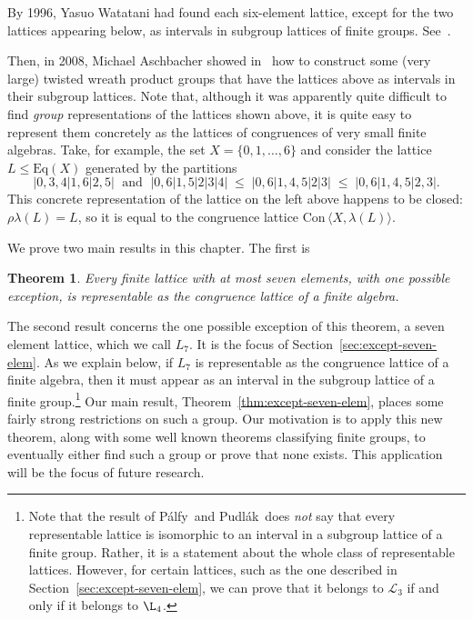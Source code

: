 \documentclass[cm,dissertation,actual,final]{uhthesis}
\theoremstyle{plain}
\newtheorem{theorem}{Theorem}[section]
\theoremstyle{definition}
\theoremstyle{remark}
\numberwithin{theorem}{section}
\numberwithin{claim}{chapter}
\numberwithin{equation}{section}
\numberwithin{conjecture}{chapter}
\newcommand{\Palfy}{P\'alfy}
\newcommand{\Pudlak}{Pudl\'ak}
\newcommand{\<}{\ensuremath{\langle}}
\renewcommand{\>}{\ensuremath{\rangle}}
\renewcommand{\leq}{\ensuremath{\leqslant}}
\newcommand{\Eq}{\ensuremath{\mathrm{Eq}}}
\newcommand{\Con}{\ensuremath{\mathrm{Con\,}}}
\newcommand{\0}{\ensuremath{\mathbf{0}}}
\newcommand{\1}{\ensuremath{\mathbf{1}}}
\newcommand{\2}{\ensuremath{\mathbf{2}}}
\newcommand{\3}{\ensuremath{\mathbf{3}}}
\newcommand{\4}{\ensuremath{\mathbf{4}}}
\newcommand{\5}{\ensuremath{\mathbf{5}}}
\newcommand{\sL}{\ensuremath{\mathscr{L}}}
\begin{document}
%
By 1996, Yasuo Watatani had found each six-element lattice, except for the
two lattices appearing below, as intervals in subgroup lattices of finite
groups.  
See~\cite{Watatani:1996}.
\begin{multicols}{2}
\hskip4cm
  \begin{tikzpicture}[scale=.5]
    
  \end{tikzpicture}
  \par \vfill \columnbreak
  \begin{tikzpicture}[scale=.6]
    
  \end{tikzpicture}
\end{multicols}
%
Then, in 2008, Michael Aschbacher
showed in~\cite{Aschbacher:2008} how to construct some (very large) twisted wreath product 
groups that have the lattices above as intervals in their subgroup lattices.
Note that, although it was apparently quite difficult to find \emph{group}
representations of the lattices shown above, it is quite easy to
represent them concretely as the lattices of congruences of very small finite
algebras.  Take, for example, the set $X=\{0,1,\dots, 6\}$ and consider the
lattice $L\leq \Eq(X)$ generated by the partitions
  \[
|0,3,4|1,6|2,5| \; \text{ and } \;  |0,6|1,5|2|3|4|  \; \leq \; |0,6|1,4,5|2|3|\; \leq \;|0,6|1,4,5|2,3|.
  \]
This concrete representation of the lattice on the left above happens to be closed:
$\rho \lambda(L) = L$, so it is equal to the congruence lattice $\Con\<X, \lambda(L)\>$.  

We prove two main results in this chapter.  The first is
\begin{theorem}
\label{thm:sevenelementlattices}
  Every finite lattice with at most seven elements, with one possible exception,
  is representable as the congruence lattice of a finite algebra.
\end{theorem}
The second result concerns the one possible exception of this theorem, 
a seven element lattice, which we call $L_7$.  It is the focus of
Section~\ref{sec:except-seven-elem}.
As we explain below, 
if $L_7$ is representable as the congruence lattice of a finite
algebra, then it must appear as an interval in the subgroup lattice of a finite
group.\footnote{Note that the result of \Palfy\ and \Pudlak\ does \emph{not} say
  that every representable lattice is isomorphic to an interval in a subgroup
  lattice of a finite group.  Rather, it is a statement about the whole class of
  representable lattices.  However, for certain lattices, such as the one described
in Section~\ref{sec:except-seven-elem}, we can prove that it belongs to $\sL_3$ if and only if it belongs to $\L_4$.}
 Our main result, Theorem~\ref{thm:except-seven-elem}, places some fairly
strong restrictions on such a group.  Our motivation is to apply this
new theorem, along with some well known theorems classifying finite groups, to
eventually either find such a group or prove that none exists.  This application
will be the focus of future research.
\end{document}
